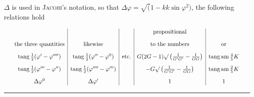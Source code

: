 $\Delta$ is used in \textsc{Jacobi}’s notation, so that $\Delta\varphi=\surd(1-kk\sin\varphi^2)$,
the following relations hold
\par\nopagebreak%
\begingroup\small\setlength{\arraycolsep}{2pt}\[
\resizebox{.98\linewidth}{!}{$\displaystyle \begin{array}{c|c|c|c|c} & & &\text{propositional}&\\[9pt] \text{the three quantities}&\text{likewise}&&\text{to the numbers}&\text{or}\\[9pt] \operatorname{tang}\frac12(\varphi'-\varphi'''')& \operatorname{tang}\frac12(\varphi''-\varphi^0)&\text{etc.}& G(2G-1)\surd\left(\frac{1}{G'G'}-\frac{1}{GG}\right)& \operatorname{tang}\operatorname{am}\frac45K\\[9pt] \operatorname{tang}\frac12(\varphi'''-\varphi'')& \operatorname{tang}\frac12(\varphi''''-\varphi''')&& -G\surd\left(\frac{1}{G'G'}-\frac{1}{GG}\right)& \operatorname{tang}\operatorname{am}\frac25K\\[9pt] \Delta\varphi^0&\Delta\varphi'&&1&1 \end{array}$}
\]\endgroup\par%

\par\nopagebreak\begin{center}\rule{.25\textwidth}{.4pt}\end{center}
\clearpage
\endgroup
